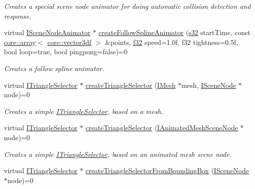 \begin{DoxyCompactItemize}
\begin{DoxyCompactList}\small\item\em Creates a special scene node animator for doing automatic collision detection and response. \end{DoxyCompactList}\item 
virtual \hyperlink{classirr_1_1scene_1_1ISceneNodeAnimator}{I\+Scene\+Node\+Animator} $\ast$ \hyperlink{classirr_1_1scene_1_1ISceneManager_ab0c9d4ab88bbe2ad71623b1054a0c3ba}{create\+Follow\+Spline\+Animator} (\hyperlink{namespaceirr_ac66849b7a6ed16e30ebede579f9b47c6}{s32} start\+Time, const \hyperlink{classirr_1_1core_1_1array}{core\+::array}$<$ \hyperlink{namespaceirr_1_1core_a06f169d08b5c429f5575acb7edbad811}{core\+::vector3df} $>$ \&points, \hyperlink{namespaceirr_a0277be98d67dc26ff93b1a6a1d086b07}{f32} speed=1.\+0f, f32 tightness=0.\+5f, bool loop=true, bool pingpong=false)=0
\begin{DoxyCompactList}\small\item\em Creates a follow spline animator. \end{DoxyCompactList}\item 
virtual \hyperlink{classirr_1_1scene_1_1ITriangleSelector}{I\+Triangle\+Selector} $\ast$ \hyperlink{classirr_1_1scene_1_1ISceneManager_a266625379b1558e9be1dc062ea4e71f7}{create\+Triangle\+Selector} (\hyperlink{classirr_1_1scene_1_1IMesh}{I\+Mesh} $\ast$mesh, \hyperlink{classirr_1_1scene_1_1ISceneNode}{I\+Scene\+Node} $\ast$node)=0
\begin{DoxyCompactList}\small\item\em Creates a simple \hyperlink{classirr_1_1scene_1_1ITriangleSelector}{I\+Triangle\+Selector}, based on a mesh. \end{DoxyCompactList}\item 
virtual \hyperlink{classirr_1_1scene_1_1ITriangleSelector}{I\+Triangle\+Selector} $\ast$ \hyperlink{classirr_1_1scene_1_1ISceneManager_abc1ecc9a60abb40e7ffddbd72c077231}{create\+Triangle\+Selector} (\hyperlink{classirr_1_1scene_1_1IAnimatedMeshSceneNode}{I\+Animated\+Mesh\+Scene\+Node} $\ast$node)=0
\begin{DoxyCompactList}\small\item\em Creates a simple \hyperlink{classirr_1_1scene_1_1ITriangleSelector}{I\+Triangle\+Selector}, based on an animated mesh scene node. \end{DoxyCompactList}\item 
virtual \hyperlink{classirr_1_1scene_1_1ITriangleSelector}{I\+Triangle\+Selector} $\ast$ \hyperlink{classirr_1_1scene_1_1ISceneManager_adb717113b4203e92f2bd95c84488059c}{create\+Triangle\+Selector\+From\+Bounding\+Box} (\hyperlink{classirr_1_1scene_1_1ISceneNode}{I\+Scene\+Node} $\ast$node)=0

\end{DoxyCompactItemize}
